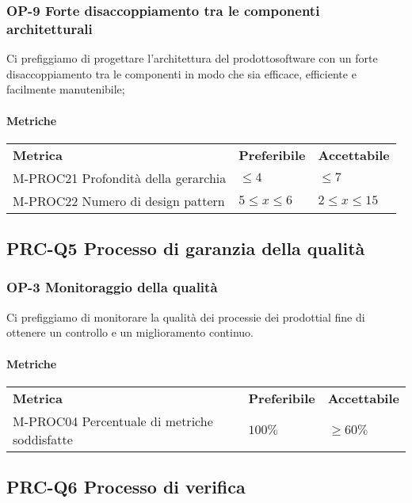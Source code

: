 		\subsubsection{OP-9 Forte disaccoppiamento tra le componenti architetturali}
		Ci prefiggiamo di progettare l'architettura del prodotto\glosp software con un forte disaccoppiamento tra le componenti in modo che sia efficace, efficiente e facilmente manutenibile;
		\paragraph{Metriche} \mbox{}
		\begin{longtable} {
				>{}p{80mm} 
				>{}p{25mm}
				>{}p{25mm}
			}
			\rowcolor{gray!50}
			\textbf{Metrica} & \textbf{Preferibile} & \textbf{Accettabile} \TBstrut \TBstrut \\
			M-PROC21 Profondità della gerarchia & $\le 4$ & $\le 7$ \TBstrut \\ [2mm]
			M-PROC22 Numero di design pattern & $5 \le x \le 6$ & $2 \le x \le 15$ \TBstrut \\ [2mm]
		\end{longtable}
			
	\subsection{PRC-Q5 Processo di garanzia della qualità}
		\subsubsection{OP-3 Monitoraggio della qualità}
			Ci prefiggiamo di monitorare la qualità dei processi\glosp e dei prodotti\glosp al fine di ottenere un controllo e un miglioramento continuo. 
			\paragraph{Metriche} \mbox{} 
			\begin{longtable} {
					>{}p{80mm} 
					>{}p{25mm}
					>{}p{25mm}
				}
				\rowcolor{gray!50}
				\textbf{Metrica} & \textbf{Preferibile} & \textbf{Accettabile} \TBstrut \TBstrut \\
				M-PROC04 Percentuale di metriche soddisfatte & $100\%$ & $\ge 60\%$ \TBstrut \\ [2mm]
			\end{longtable}

	\subsection{PRC-Q6 Processo di verifica}

